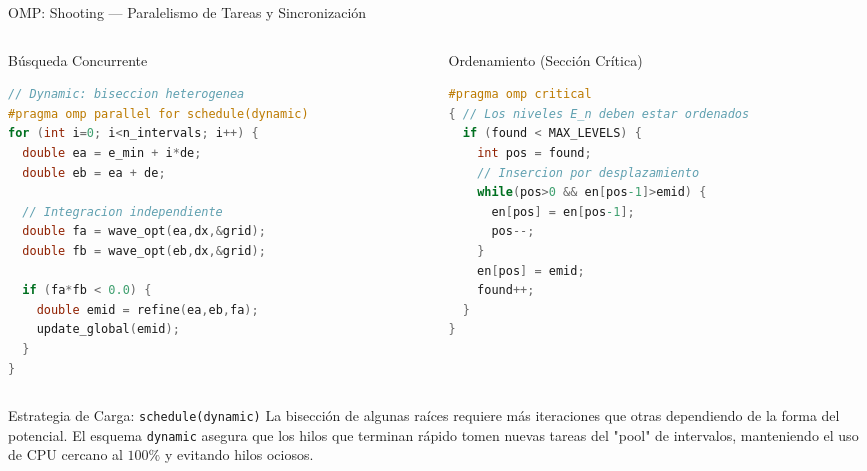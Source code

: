 \documentclass[aspectratio=169,10pt]{beamer}
\begin{document}
\begin{frame}[fragile]{OMP: Shooting — Paralelismo de Tareas y Sincronización}

\begin{columns}[T]

  \begin{column}{0.48\textwidth}
    \begin{block}{Búsqueda Concurrente}
    \begin{lstlisting}[language=C,style=cppBeamer,basicstyle=\tiny\ttfamily]
// Dynamic: biseccion heterogenea
#pragma omp parallel for schedule(dynamic)
for (int i=0; i<n_intervals; i++) {
  double ea = e_min + i*de;
  double eb = ea + de;

  // Integracion independiente
  double fa = wave_opt(ea,dx,&grid);
  double fb = wave_opt(eb,dx,&grid);

  if (fa*fb < 0.0) {
    double emid = refine(ea,eb,fa);
    update_global(emid); 
  }
}
    \end{lstlisting}
    \end{block}
  \end{column}

  \begin{column}{0.48\textwidth}
    \begin{block}{Ordenamiento (Sección Crítica)}
    \begin{lstlisting}[language=C,style=cppBeamer,basicstyle=\tiny\ttfamily]
#pragma omp critical
{ // Los niveles E_n deben estar ordenados
  if (found < MAX_LEVELS) {
    int pos = found;
    // Insercion por desplazamiento
    while(pos>0 && en[pos-1]>emid) {
      en[pos] = en[pos-1];
      pos--;
    }
    en[pos] = emid;
    found++;
  }
}
    \end{lstlisting}
    \end{block}
  \end{column}

\end{columns}

\vspace{-0.4cm}

\begin{successbox}{Estrategia de Carga: \texttt{schedule(dynamic)}}
La bisección de algunas raíces requiere más iteraciones que otras dependiendo de la forma del potencial. El esquema \texttt{dynamic} asegura que los hilos que terminan rápido tomen nuevas tareas del "pool" de intervalos, manteniendo el uso de CPU cercano al $100\%$ y evitando hilos ociosos.
\end{successbox}

\end{frame}
\end{document}
